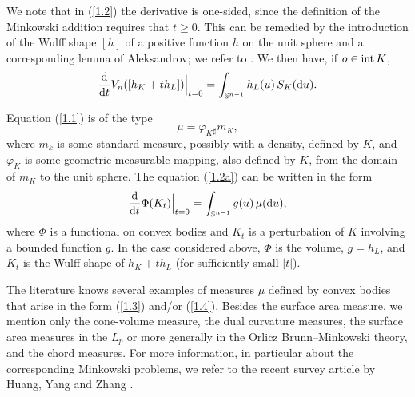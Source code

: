 \documentclass[12pt]{article}
\newcommand{\0}{\mbox{\boldmath$o$}}
\newcommand{\Sn}{{\mathbb S}^{n-1}}
\newcommand{\D}{{\rm d}}
\begin{document}
We note that in (\ref{1.2}) the derivative is one-sided, since the definition of the Minkowski addition requires that $t\ge 0$. This can be remedied by the introduction of the Wulff shape $[h]$ of a positive function $h$ on the unit sphere and a corresponding lemma of Aleksandrov; we refer to \cite[Sect. 7.5]{Sch14}. We then have, if $o \in{\rm int}\,K$, 
\begin{equation}\label{1.2a}
\frac{\D}{\D t} V_n([h_K+th_L])\Big|_{t=0} = \int_{\Sn} h_L(u)\,S_K(\D u).
\end{equation}

Equation (\ref{1.1}) is of the type
\begin{equation}\label{1.3} 
\mu= \varphi_K{_\sharp} m_K,
\end{equation}
where $m_k$ is some standard measure, possibly with a density, defined by $K$, and $\varphi_K$ is some geometric measurable mapping, also defined by $K$, from the domain of $m_K$ to the unit sphere. The equation (\ref{1.2a}) can be written in the form
\begin{equation}\label{1.4}
\frac{\D}{\D t} \Phi(K_t)\Big|_{t=0} = \int_{\Sn} g(u)\,\mu(\D u),
\end{equation}
where $\Phi$ is a functional on convex bodies and $K_t$ is a perturbation of $K$ involving a bounded function $g$. In the case considered above, $\Phi$ is the volume, $g=h_L$, and $K_t$ is the Wulff shape of $h_K+th_L$ (for sufficiently small $|t|$). 

The literature knows several examples of measures $\mu$ defined by convex bodies that arise in the form (\ref{1.3}) and/or (\ref{1.4}). Besides the surface area measure, we mention only the cone-volume measure, the dual curvature measures, the surface area measures in the $L_p$ or more generally in the Orlicz Brunn--Minkowski theory, and the chord measures. For more information, in particular about the corresponding Minkowski problems, we refer to the recent survey article by Huang, Yang and Zhang \cite{HYZ25}.
\end{document}
